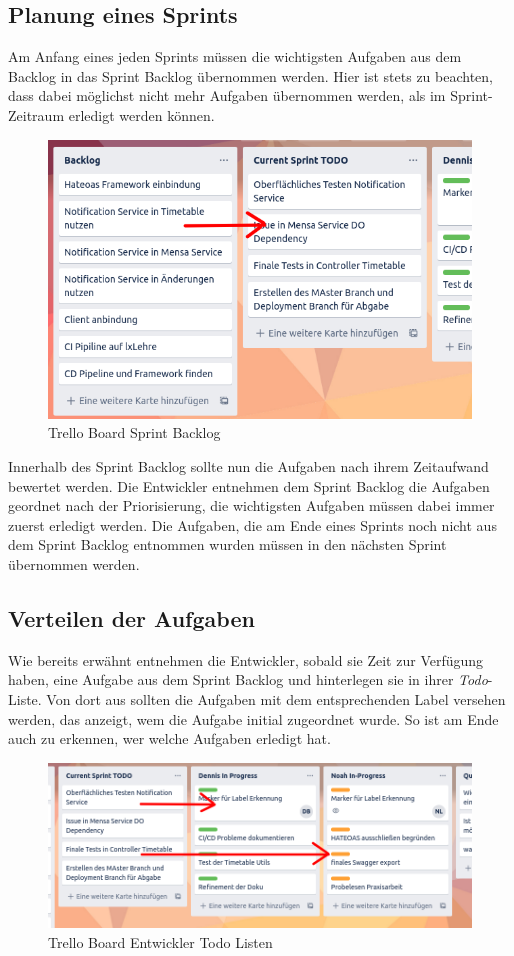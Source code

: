 \subsection*{Planung eines Sprints}

Am Anfang eines jeden Sprints müssen die wichtigsten Aufgaben aus dem Backlog in das Sprint Backlog übernommen werden. Hier ist stets zu beachten, dass dabei möglichst nicht mehr Aufgaben übernommen werden, als im Sprint-Zeitraum erledigt werden können. 

\begin{figure}[H]
\centering
\includegraphics[width=10 cm]{Bilder/Kapitel_2/sprint_backlog.png}
\caption{Trello Board Sprint Backlog\label{fig:trello_sprint_backlog}}
\end{figure}

Innerhalb des Sprint Backlog sollte nun die Aufgaben nach ihrem Zeitaufwand bewertet werden. Die Entwickler entnehmen dem Sprint Backlog die Aufgaben geordnet nach der Priorisierung, die wichtigsten Aufgaben müssen dabei immer zuerst erledigt werden. Die Aufgaben, die am Ende eines Sprints noch nicht aus dem Sprint Backlog entnommen wurden müssen in den nächsten Sprint übernommen werden.

\subsection*{Verteilen der Aufgaben}

Wie bereits erwähnt entnehmen die Entwickler, sobald sie Zeit zur Verfügung haben, eine Aufgabe aus dem Sprint Backlog und hinterlegen sie in ihrer \textit{Todo}-Liste. Von dort aus sollten die Aufgaben mit dem entsprechenden Label versehen werden, das anzeigt, wem die Aufgabe initial zugeordnet wurde. So ist am Ende auch zu erkennen, wer welche Aufgaben erledigt hat.

\begin{figure}[H]
\centering
\includegraphics[width=14 cm]{Bilder/Kapitel_2/user_boards.png}
\caption{Trello Board Entwickler Todo Listen\label{fig:trello_user_boards}}
\end{figure}

